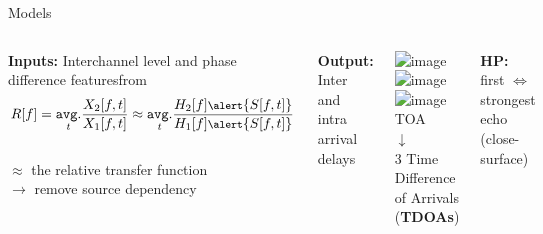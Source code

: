 \begin{frame}{Models \hfill\faBrain}

    \begin{columns}[T,onlytextwidth]
        \textbf{Inputs:}
        {\small Interchannel level and phase difference features\footnotemark[1] from
            \[ \footnotesize
            R[f] = \timeavg \frac{X_2[f,t]}{X_1[f,t]}
            \approx \timeavg \frac{H_2[f]\alert{S[f,t]}}{H_1[f]\alert{S[f,t]}}
            \]
            \\$\approx$ the relative transfer function
            \\$\to$ remove source dependency
        }

        \textbf{Output:} {\small Inter and intra arrival delays}
        \begin{columns}
            \includegraphics<1>[width=\textwidth]{figures/lantern_rir_tdoa1(1).png}%
            \includegraphics<2>[width=\textwidth]{figures/lantern_rir_tdoa1(2).png}%
            \includegraphics<3->[width=\textwidth]{figures/lantern_rir_tdoa1(3).png}%
            \footnotesize
             TOA
            \\$\downarrow$
            \\3 Time \alert{Difference} of Arrivals (\alert{\textbf{TDOAs}})\footnotemark[1]
        \end{columns}
        {\small \textbf{HP:} first $\Leftrightarrow$ strongest echo (close-surface)}
    \end{columns}

    \begin{center}
    \end{center}


\end{frame}
